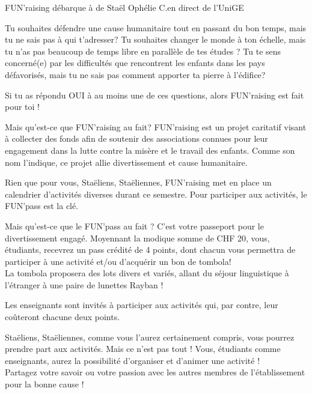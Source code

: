 \newpage





\vspace*{-1.7cm}\begin{article}
{FUN’raising débarque à de Staël}
{Ophélie C.}{en direct de l’UniGE}

\begin{spacing}{1.05}
Tu souhaites défendre une cause humanitaire tout en passant du bon temps, mais tu ne sais pas à qui t’adresser? 
Tu souhaites changer le monde à ton échelle, mais tu n’as pas beaucoup de temps libre en parallèle de tes études ?
Tu te sens concerné(e) par les difficultés que rencontrent les enfants dans les pays défavorisés, mais tu ne sais pas comment apporter ta pierre à l’édifice?

Si tu as répondu OUI à au moins une de ces questions, alors FUN’raising est fait pour toi !

Mais qu’est-ce que FUN’raising au fait? FUN’raising est un projet caritatif visant à collecter des fonds afin de soutenir des associations connues pour leur engagement dans la lutte contre la misère et le travail des enfants. Comme son nom l’indique, ce projet allie divertissement et cause humanitaire.\columnbreak

Rien que pour vous, Staëliens, Staëliennes, FUN’raising met en place un calendrier d’activités diverses durant ce semestre. Pour participer aux activités, le FUN’pass est la clé. 


Mais qu’est-ce que le FUN’pass au fait ? C’est votre passeport pour le divertissement engagé. Moyennant la modique somme de CHF 20, vous, étudiants, recevrez un pass crédité de 4 points, dont chacun vous permettra de participer à une activité et/ou d’acquérir un bon de tombola!\\
La tombola proposera des lots divers et variés, allant du séjour linguistique à l’étranger à une paire de lunettes Rayban !

Les enseignants sont invités à participer aux activités qui, par contre, leur coûteront chacune deux points.

Staëliens, Staëliennes, comme vous l’aurez certainement compris, vous pourrez prendre part aux activités. Mais ce n’est pas tout ! Vous, étudiants comme enseignants,  aurez la possibilité d’organiser et d’animer une activité !\\
Partagez votre savoir ou votre passion avec les autres membres de l’établissement pour la bonne cause !


\end{spacing}
\end{article}
